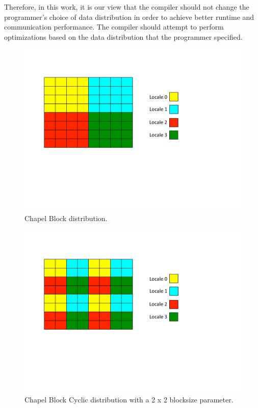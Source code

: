 Therefore, in this work, it is our view that the compiler should not change the programmer's choice of data distribution in order to achieve better runtime and communication performance. The compiler should attempt to perform optimizations based on the data distribution that the programmer specified. 

\begin{figure}
	\begin{center}
	\includegraphics[scale=0.50]{./Figures/block_dist}
	\caption{Chapel Block distribution.}
	\label{block_dist}
	\end{center}
\end{figure}

\begin{figure}
	\begin{center}
	\includegraphics[scale=0.50]{./Figures/block_cyc_dist}
	\caption{Chapel Block Cyclic distribution with a 2 x 2 blocksize parameter.}
	\label{block_cyc_dist}
	\end{center}
\end{figure}

